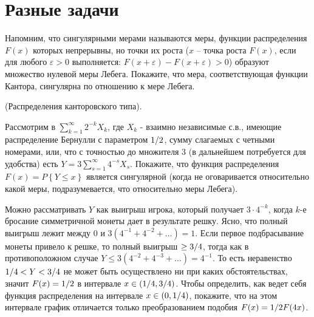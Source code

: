 \section{Разные задачи}

\begin{problem}
Напомним, что сингулярными мерами называются меры, функции распределения $F(x)$ которых непрерывны, но точки их роста ($x$ -- точка роста $F(x)$, если для любого $\varepsilon >0$ выполняется: $F(x+\varepsilon )-F(x+\varepsilon )>0$) образуют множество нулевой меры Лебега. Покажите, что мера, соответствующая функции Кантора, сингулярна по отношению к мере Лебега.
\end{problem}


\begin{problem}
(Распределения канторовского типа).

Рассмотрим в $\sum _{k=1}^{\infty }2^{-k} X_{k}  $, где $X_{k} $ - взаимно независимые с.в., имеющие распределение Бернулли с параметром ${1\mathord{\left/ {\vphantom {1 2}} \right. \kern-\nulldelimiterspace} 2} $, сумму слагаемых с четными номерами, или, что с точностью до множителя 3 (в дальнейшем потребуется для удобства) есть $Y=3\sum _{s=1}^{\infty }4^{-s} X_{s}  $. Покажите, что функция распределения $F(x)=P\left\{Y\le x\right\}$ является сингулярной (когда не оговаривается относительно какой меры, подразумевается, что относительно меры Лебега).


\begin{ordre}
Можно рассматривать $Y$ как выигрыш игрока, который получает $3\cdot 4^{-k} $, когда $k$-е бросание симметричной монеты дает в результате решку. Ясно, что полный выигрыш лежит между 0 и $3\left(4^{-1} +4^{-2} +\ldots \right)=1$. Если первое подбрасывание монеты привело к решке, то полный выигрыш $\ge {3\mathord{\left/ {\vphantom {3 4}} \right. \kern-\nulldelimiterspace} 4} $, тогда как в противоположном случае $Y\le 3\left(4^{-2} +4^{-3} +\ldots \right)=4^{-1} $. То есть неравенство ${1\mathord{\left/ {\vphantom {1 4}} \right. \kern-\nulldelimiterspace} 4} <Y<{3\mathord{\left/ {\vphantom {3 4}} \right. \kern-\nulldelimiterspace} 4} $ не может быть осуществлено ни при каких обстоятельствах, значит $F(x)={1\mathord{\left/ {\vphantom {1 2}} \right. \kern-\nulldelimiterspace} 2} $ в интервале $x\in \left({1\mathord{\left/ {\vphantom {1 4}} \right. \kern-\nulldelimiterspace} 4} ,{3\mathord{\left/ {\vphantom {3 4}} \right. \kern-\nulldelimiterspace} 4} \right)$. Чтобы определить, как ведет себя функция распределения на интервале $x\in \left(0,{1\mathord{\left/ {\vphantom {1 4}} \right. \kern-\nulldelimiterspace} 4} \right)$, покажите, что на этом интервале график отличается только преобразованием подобия $F(x)={1\mathord{\left/ {\vphantom {1 2}} \right. \kern-\nulldelimiterspace} 2} F(4x)$.
\end{ordre}


\end{problem}

